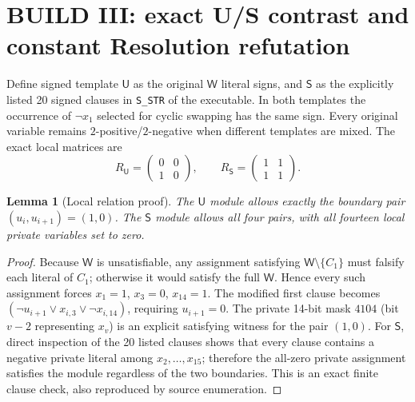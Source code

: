 \documentclass[11pt]{article}
\newtheorem{lemma}[theorem]{Lemma}
\newcommand{\W}{\mathsf{W}}
\newcommand{\U}{\mathsf{U}}
\newcommand{\V}{\mathsf{S}}
\begin{document}
\section{BUILD III: exact U/S contrast and constant Resolution refutation}
Define signed template \(\U\) as the original $\W$ literal signs, and \(\V\) as the explicitly listed 20 signed clauses in \texttt{S\_STR} of the executable. In both templates the occurrence of $\neg x_1$ selected for cyclic swapping has the same sign. Every original variable remains $2$-positive/$2$-negative when different templates are mixed. The exact local matrices are
\[
 R_{\U}=\begin{pmatrix}0&0\\1&0\end{pmatrix},
 \qquad R_{\V}=\begin{pmatrix}1&1\\1&1\end{pmatrix}.
\]
\begin{lemma}[Local relation proof]\label{lem:local}
The $\U$ module allows exactly the boundary pair $(u_i,u_{i+1})=(1,0)$. The $\V$ module allows all four pairs, with all fourteen local private variables set to zero.
\end{lemma}
\begin{proof}
Because $\W$ is unsatisfiable, any assignment satisfying $\W\setminus\{C_1\}$ must falsify each literal of $C_1$; otherwise it would satisfy the full $\W$. Hence every such assignment forces $x_1=1$, $x_3=0$, $x_{14}=1$. The modified first clause becomes $(\neg u_{i+1}\vee x_{i,3}\vee\neg x_{i,14})$, requiring $u_{i+1}=0$. The private 14-bit mask $4104$ (bit $v-2$ representing $x_v$) is an explicit satisfying witness for the pair $(1,0)$. For $\V$, direct inspection of the 20 listed clauses shows that every clause contains a negative private literal among $x_2,\ldots,x_{15}$; therefore the all-zero private assignment satisfies the module regardless of the two boundaries. This is an exact finite clause check, also reproduced by source enumeration.
\end{proof}
\end{document}

